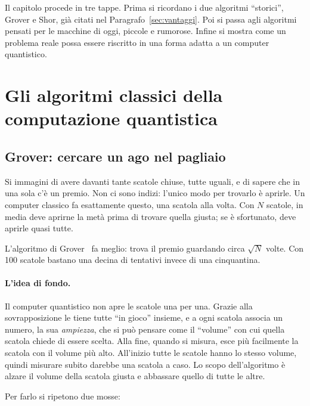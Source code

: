 Il capitolo procede in tre tappe. Prima si ricordano i due algoritmi
``storici'', Grover e Shor, già citati nel Paragrafo~\ref{sec:vantaggi}. Poi si
passa agli algoritmi pensati per le macchine di oggi, piccole e rumorose. Infine
si mostra come un problema reale possa essere riscritto in una forma adatta a
un computer quantistico.

\section{Gli algoritmi classici della computazione quantistica}
\label{sec:alg-classici}

\subsection{Grover: cercare un ago nel pagliaio}
\label{subsec:alg-grover}

Si immagini di avere davanti tante scatole chiuse, tutte uguali, e di sapere
che in una sola c'è un premio. Non ci sono indizi: l'unico modo per trovarlo è
aprirle. Un computer classico fa esattamente questo, una scatola alla volta.
Con $N$ scatole, in media deve aprirne la metà prima di trovare quella giusta;
se è sfortunato, deve aprirle quasi tutte.

L'algoritmo di Grover~\cite{grover1996fast} fa meglio: trova il premio
guardando circa $\sqrt{N}$ volte. Con 100 scatole bastano una decina di
tentativi invece di una cinquantina.

\paragraph{L'idea di fondo.} Il computer quantistico non apre le scatole una
per una. Grazie alla sovrapposizione le tiene tutte ``in gioco'' insieme, e a
ogni scatola associa un numero, la sua \textit{ampiezza}, che si può pensare
come il ``volume'' con cui quella scatola chiede di essere scelta. Alla fine,
quando si misura, esce più facilmente la scatola con il volume più alto.
All'inizio tutte le scatole hanno lo stesso volume, quindi misurare subito
darebbe una scatola a caso. Lo scopo dell'algoritmo è alzare il volume della
scatola giusta e abbassare quello di tutte le altre.

Per farlo si ripetono due mosse:

